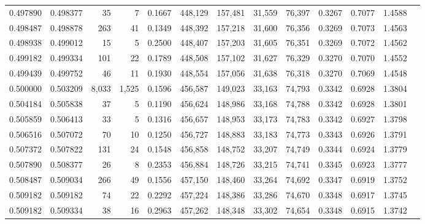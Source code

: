 \begin{tabular}{rrrrrrrrrrrrr}
0.497890 & 0.498377 &     35 &     7 &                                     0.1667 & 448,129 & 157,481 &  31,559 &  76,397 & 0.3267 & 0.7077 & 1.4588 \\
0.498487 & 0.498878 &    263 &    41 &                                     0.1349 & 448,392 & 157,218 &  31,600 &  76,356 & 0.3269 & 0.7073 & 1.4563 \\
0.498938 & 0.499012 &     15 &     5 &                                     0.2500 & 448,407 & 157,203 &  31,605 &  76,351 & 0.3269 & 0.7072 & 1.4562 \\
0.499182 & 0.499334 &    101 &    22 &                                     0.1789 & 448,508 & 157,102 &  31,627 &  76,329 & 0.3270 & 0.7070 & 1.4552 \\
0.499439 & 0.499752 &     46 &    11 &                                     0.1930 & 448,554 & 157,056 &  31,638 &  76,318 & 0.3270 & 0.7069 & 1.4548 \\
0.500000 & 0.503209 &  8,033 & 1,525 &                                     0.1596 & 456,587 & 149,023 &  33,163 &  74,793 & 0.3342 & 0.6928 & 1.3804 \\
0.504184 & 0.505838 &     37 &     5 &                                     0.1190 & 456,624 & 148,986 &  33,168 &  74,788 & 0.3342 & 0.6928 & 1.3801 \\
0.505859 & 0.506413 &     33 &     5 &                                     0.1316 & 456,657 & 148,953 &  33,173 &  74,783 & 0.3342 & 0.6927 & 1.3798 \\
0.506516 & 0.507072 &     70 &    10 &                                     0.1250 & 456,727 & 148,883 &  33,183 &  74,773 & 0.3343 & 0.6926 & 1.3791 \\
0.507372 & 0.507822 &    131 &    24 &                                     0.1548 & 456,858 & 148,752 &  33,207 &  74,749 & 0.3344 & 0.6924 & 1.3779 \\
0.507890 & 0.508377 &     26 &     8 &                                     0.2353 & 456,884 & 148,726 &  33,215 &  74,741 & 0.3345 & 0.6923 & 1.3777 \\
0.508487 & 0.509034 &    266 &    49 &                                     0.1556 & 457,150 & 148,460 &  33,264 &  74,692 & 0.3347 & 0.6919 & 1.3752 \\
0.509182 & 0.509182 &     74 &    22 &                                     0.2292 & 457,224 & 148,386 &  33,286 &  74,670 & 0.3348 & 0.6917 & 1.3745 \\
0.509182 & 0.509334 &     38 &    16 &                                     0.2963 & 457,262 & 148,348 &  33,302 &  74,654 & 0.3348 & 0.6915 & 1.3742 \\

\end{tabular}

